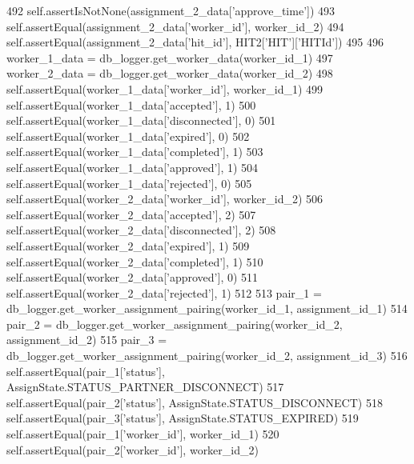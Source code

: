\begin{DoxyCode}
492         self.assertIsNotNone(assignment\_2\_data[\textcolor{stringliteral}{'approve\_time'}])
493         self.assertEqual(assignment\_2\_data[\textcolor{stringliteral}{'worker\_id'}], worker\_id\_2)
494         self.assertEqual(assignment\_2\_data[\textcolor{stringliteral}{'hit\_id'}], HIT2[\textcolor{stringliteral}{'HIT'}][\textcolor{stringliteral}{'HITId'}])
495 
496         worker\_1\_data = db\_logger.get\_worker\_data(worker\_id\_1)
497         worker\_2\_data = db\_logger.get\_worker\_data(worker\_id\_2)
498         self.assertEqual(worker\_1\_data[\textcolor{stringliteral}{'worker\_id'}], worker\_id\_1)
499         self.assertEqual(worker\_1\_data[\textcolor{stringliteral}{'accepted'}], 1)
500         self.assertEqual(worker\_1\_data[\textcolor{stringliteral}{'disconnected'}], 0)
501         self.assertEqual(worker\_1\_data[\textcolor{stringliteral}{'expired'}], 0)
502         self.assertEqual(worker\_1\_data[\textcolor{stringliteral}{'completed'}], 1)
503         self.assertEqual(worker\_1\_data[\textcolor{stringliteral}{'approved'}], 1)
504         self.assertEqual(worker\_1\_data[\textcolor{stringliteral}{'rejected'}], 0)
505         self.assertEqual(worker\_2\_data[\textcolor{stringliteral}{'worker\_id'}], worker\_id\_2)
506         self.assertEqual(worker\_2\_data[\textcolor{stringliteral}{'accepted'}], 2)
507         self.assertEqual(worker\_2\_data[\textcolor{stringliteral}{'disconnected'}], 2)
508         self.assertEqual(worker\_2\_data[\textcolor{stringliteral}{'expired'}], 1)
509         self.assertEqual(worker\_2\_data[\textcolor{stringliteral}{'completed'}], 1)
510         self.assertEqual(worker\_2\_data[\textcolor{stringliteral}{'approved'}], 0)
511         self.assertEqual(worker\_2\_data[\textcolor{stringliteral}{'rejected'}], 1)
512 
513         pair\_1 = db\_logger.get\_worker\_assignment\_pairing(worker\_id\_1, assignment\_id\_1)
514         pair\_2 = db\_logger.get\_worker\_assignment\_pairing(worker\_id\_2, assignment\_id\_2)
515         pair\_3 = db\_logger.get\_worker\_assignment\_pairing(worker\_id\_2, assignment\_id\_3)
516         self.assertEqual(pair\_1[\textcolor{stringliteral}{'status'}], AssignState.STATUS\_PARTNER\_DISCONNECT)
517         self.assertEqual(pair\_2[\textcolor{stringliteral}{'status'}], AssignState.STATUS\_DISCONNECT)
518         self.assertEqual(pair\_3[\textcolor{stringliteral}{'status'}], AssignState.STATUS\_EXPIRED)
519         self.assertEqual(pair\_1[\textcolor{stringliteral}{'worker\_id'}], worker\_id\_1)
520         self.assertEqual(pair\_2[\textcolor{stringliteral}{'worker\_id'}], worker\_id\_2)

\end{DoxyCode}
